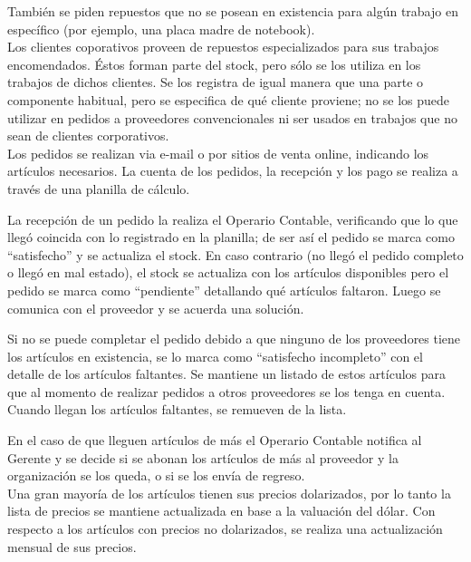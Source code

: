 \documentclass[12pt]{extarticle}
\begin{document}
\begin{spacing}{1.2}
    También se piden repuestos que no se posean en existencia para algún trabajo en específico (por ejemplo, una placa madre de notebook).\\

    Los clientes coporativos proveen de repuestos especializados para sus trabajos encomendados. Éstos forman parte del stock, pero sólo se los utiliza en los trabajos de dichos clientes. Se los registra de igual manera que una parte o componente habitual, pero se especifica de qué cliente proviene; no se los puede utilizar en pedidos a proveedores convencionales ni ser usados en trabajos que no sean de clientes corporativos.\\

    Los pedidos se realizan via e-mail o por sitios de venta online, indicando los artículos necesarios. La cuenta de los pedidos, la recepción y los pago se realiza a través de una planilla de cálculo. 

    La recepción de un pedido la realiza el Operario Contable, verificando que lo que llegó coincida con lo registrado en la planilla; de ser así el pedido se marca como ``satisfecho'' y se actualiza el stock. En caso contrario (no llegó el pedido completo o llegó en mal estado), el stock se actualiza con los artículos disponibles pero el pedido se marca como ``pendiente'' detallando qué artículos faltaron. Luego se comunica con el proveedor y se acuerda una solución.

    Si no se puede completar el pedido debido a que ninguno de los proveedores tiene los artículos en existencia, se lo marca como ``satisfecho incompleto'' con el detalle de los artículos faltantes. Se mantiene un listado de estos artículos para que al momento de realizar pedidos a otros proveedores se los tenga en cuenta. Cuando llegan los artículos faltantes, se remueven de la lista.

    En el caso de que lleguen artículos de más el Operario Contable notifica al Gerente y se decide si se abonan los artículos de más al proveedor y la organización se los queda, o si se los envía de regreso.\\

    Una gran mayoría de los artículos tienen sus precios dolarizados, por lo tanto la lista de precios se mantiene actualizada en base a la valuación del dólar. Con respecto a los artículos con precios no dolarizados, se realiza una actualización mensual de sus precios.

    \pagebreak

\end{spacing}
\end{document}
